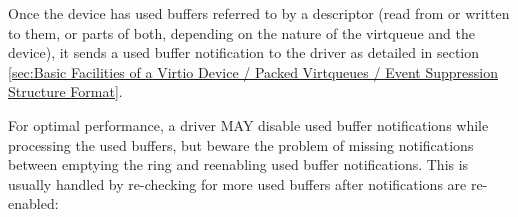 Once the device has used buffers referred to by a descriptor (read from or written to them, or
parts of both, depending on the nature of the virtqueue and the
device), it sends a used buffer notification to the driver
as detailed in section \ref{sec:Basic
Facilities of a Virtio Device / Packed Virtqueues / Event
Suppression Structure Format}.

\begin{note}

For optimal performance, a driver MAY disable used buffer notifications
while processing the used buffers, but beware the problem of missing
notifications between emptying the ring and reenabling used buffer
notifications.  This is usually handled by re-checking for more used
buffers after notifications are re-enabled:

\end{note}

